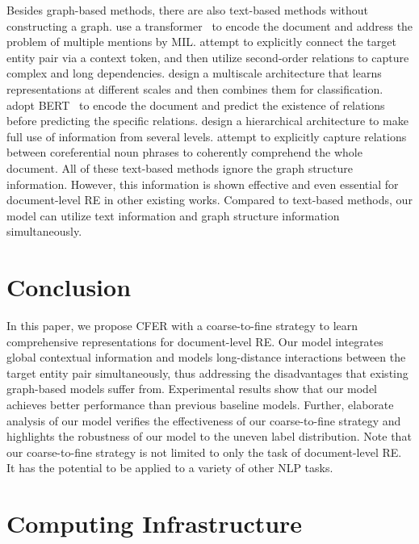 \documentclass[letterpaper]{article} \usepackage{aaai21}  \usepackage{times}  \usepackage{helvet} \usepackage{courier}  \usepackage[hyphens]{url}  \usepackage{graphicx} \urlstyle{rm} \def\UrlFont{\rm}  \usepackage{natbib}  \usepackage{caption} \frenchspacing  \setlength{\pdfpagewidth}{8.5in}  \setlength{\pdfpageheight}{11in}
\begin{document}
Besides graph-based methods, there are also text-based methods without constructing a graph. 
\citet{barn} use a transformer~\citep{transformer} to encode the document and address the problem of multiple mentions by MIL. 
\citet{sor} attempt to explicitly connect the target entity pair via a context token, and then utilize second-order relations to capture complex and long dependencies. 
\citet{multiscale} design a multiscale architecture that learns representations at different scales and then combines them for classification. 
\citet{bert_two_step} adopt BERT~\citep{bert} to encode the document and predict the existence of relations before predicting the specific relations. 
\citet{hin} design a hierarchical architecture to make full use of information from several levels. 
\citet{coref_bert} attempt to explicitly capture relations between coreferential noun phrases to coherently comprehend the whole document. 
All of these text-based methods ignore the graph structure information. 
However, this information is shown effective and even essential for document-level RE in other existing works. 
Compared to text-based methods, our model can utilize text information and graph structure information simultaneously. 

\section{Conclusion}

In this paper, we propose CFER with a coarse-to-fine strategy to learn comprehensive representations for document-level RE. 
Our model integrates global contextual information and models long-distance interactions between the target entity pair simultaneously, thus addressing the disadvantages that existing graph-based models suffer from. 
Experimental results show that our model achieves better performance than previous baseline models. 
Further, elaborate analysis of our model verifies the effectiveness of our coarse-to-fine strategy and highlights the robustness of our model to the uneven label distribution. 
Note that our coarse-to-fine strategy is not limited to only the task of document-level RE. 
It has the potential to be applied to a variety of other NLP tasks.



\onecolumn
\appendix
\appendixpage

\section{Computing Infrastructure}
\end{document}
